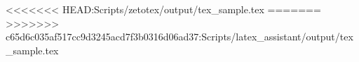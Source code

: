 <<<<<<< HEAD:Scripts/zetotex/output/tex_sample.tex
=======
>>>>>>> c65d6c035af517cc9d3245acd7f3b0316d06ad37:Scripts/latex_assistant/output/tex_sample.tex


\newcommand{\commandWithFloat}{1.0002}

\newcommand{\commandWithInteger}{1}

\newcommand{\SampleArray}{
	\begin{tabular}{|c|c|c|c|c|c|}
	\hline Column 0 & Column 1 & Column 2 & Column 3 & Column 4 & Column 5 \\
	\hline 0 & 1 & 2 & 3 &   &  \\
	\hline 0 & 1 & 2 & 3 &   &  \\
	\hline 0 & 1 & 2 & 3 &   &  \\
	\hline 0 & 1 & 2 & 3 &   &  \\
	\hline
 	\end{tabular}
}

